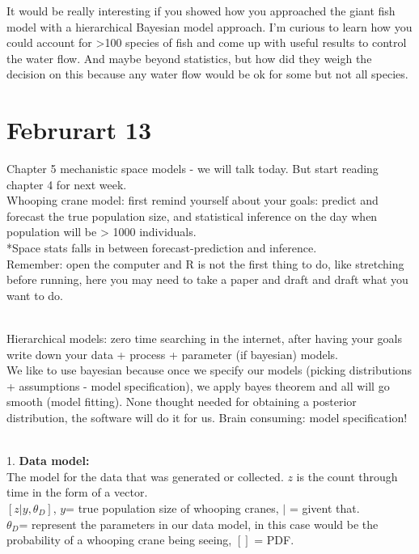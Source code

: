 \documentclass[
]{book}
\begin{document}
It would be really interesting if you showed how you approached the giant fish model with a hierarchical Bayesian model approach. I'm curious to learn how you could account for \textgreater100 species of fish and come up with useful results to control the water flow. And maybe beyond statistics, but how did they weigh the decision on this because any water flow would be ok for some but not all species.

\hypertarget{februrart-13}{%
\section{Februrart 13}\label{februrart-13}}

Chapter 5 mechanistic space models - we will talk today. But start reading chapter 4 for next week.\\
Whooping crane model: first remind yourself about your goals: predict and forecast the true population size, and statistical inference on the day when population will be \textgreater{} 1000 individuals.\\
*Space stats falls in between forecast-prediction and inference.\\
Remember: open the computer and R is not the first thing to do, like stretching before running, here you may need to take a paper and draft and draft what you want to do.\\
\strut \\
Hierarchical models: zero time searching in the internet, after having your goals write down your data + process + parameter (if bayesian) models.\\
We like to use bayesian because once we specify our models (picking distributions + assumptions - model specification), we apply bayes theorem and all will go smooth (model fitting). None thought needed for obtaining a posterior distribution, the software will do it for us. Brain consuming: model specification!\\
\strut \\
1. \textbf{Data model:}\\
The model for the data that was generated or collected. \(z\) is the count through time in the form of a vector.\\
\([z|y, \theta_D]\), \(y\)= true population size of whooping cranes, \(|\) = givent that.\\
\(\theta_D\)= represent the parameters in our data model, in this case would be the probability of a whooping crane being seeing, \([]\) = PDF.\\
\end{document}
